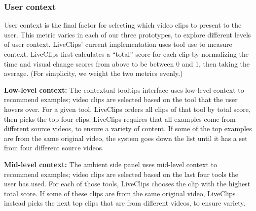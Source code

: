 \subsubsection{User context}
User context is the final factor for selecting which video clips to present to the user. This metric varies in each of our three prototypes, to explore different levels of user context. LiveClips' current implementation uses tool use to measure context. LiveClips first calculates a ``total'' score for each clip by normalizing the time and visual change scores from above to be between 0 and 1, then taking the average. (For simplicity, we weight the two metrics evenly.) 

\textbf{Low-level context:} The contextual tooltips interface uses low-level context to recommend examples; video clips are selected based on the tool that the user hovers over. For a given tool, LiveClips orders all clips of that tool by total score, then picks the top four clips. LiveClips requires that all examples come from different source videos, to ensure a variety of content. If some of the top examples are from the same original video, the system goes down the list until it has a set from four different source videos. %

\textbf{Mid-level context:} The ambient side panel uses mid-level context to recommend examples; video clips are selected based on the last four tools the user has used. For each of those tools, LiveClips chooses the clip with the highest total score. If some of these clips are from the same original video, LiveClips instead picks the next top clips that are from different videos, to ensure variety.

